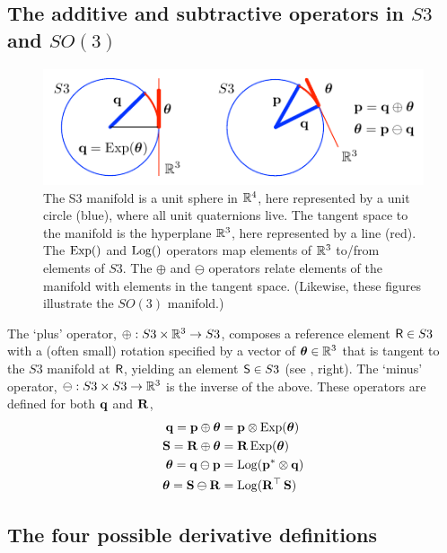 \subsection{The additive and subtractive operators in $S3$ and $SO(3)$}

\begin{figure}[tb]
\centering
\includegraphics{figures/manifold}
\caption{The S3 manifold is a unit sphere in ${\mathbb R}^4$, here represented by a unit circle (blue),  where all unit quaternions live. The tangent space to the manifold is the hyperplane ${\mathbb R}^3$, here represented by a line (red). The $\operatorname*{Exp}()$ and $\operatorname*{Log}()$ operators map elements of ${\mathbb R}^3$ to/from elements of $S3$. The $\oplus$ and $\ominus$ operators relate elements of the manifold with elements in the tangent space. (Likewise, these figures illustrate the $SO(3)$ manifold.)}
\label{fig:manifold}
\end{figure}




The `plus' operator, $\oplus:S3\times{\mathbb R}^3\to S3$, composes a reference element $\mathsf R\in S3$ with a (often small) rotation specified by a vector of ${{\bm \theta}}\in{\mathbb R}^3$ that is tangent to the $S3$ manifold at $\mathsf R$, yielding an element $\mathsf S\in S3$ (see , right). 
The `minus' operator, $\ominus:S3\times S3\to{\mathbb R}^3$ is the inverse of the above.
These operators are defined for both ${\bf q}$ and ${\bf R}$,
%
\begin{align}
{\bf q} = {\bf p}\oplus{{\bm \theta}}  &= {\bf p}\otimes\operatorname*{Exp}({{\bm \theta}}) \label{equ:plus_q} \\
{\bf S} = {\bf R}\oplus {{\bm \theta}} &= {\bf R}\operatorname*{Exp}({{\bm \theta}}) \label{equ:plus_R} \\
{{\bm \theta}} = {\bf q}\ominus{\bf p} &= \operatorname*{Log}({\bf p}^*\otimes{\bf q}) \label{equ:minus_q}\\
{{\bm \theta}} = {\bf S}\ominus{\bf R} &= \operatorname*{Log}({\bf R}^{\top}\,{\bf S})  \label{equ:minus_R}                       
\end{align}


\subsection{The four possible derivative definitions}

